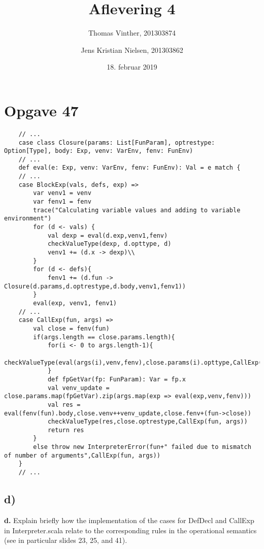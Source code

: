 \documentclass[a4paper, 10pt]{article}
\title{Aflevering 4}
\author{Thomas Vinther, 201303874 \and Jens Kristian Nielsen, 201303862}
\date{18. februar 2019}
\theoremstyle{remark}
\begin{document}
	\maketitle
	\section*{Opgave 47}
	\begin{lstlisting}
	// ...
	case class Closure(params: List[FunParam], optrestype: Option[Type], body: Exp, venv: VarEnv, fenv: FunEnv)
	// ...
	def eval(e: Exp, venv: VarEnv, fenv: FunEnv): Val = e match {
	// ...
	case BlockExp(vals, defs, exp) => 
		var venv1 = venv
		var fenv1 = fenv
		trace("Calculating variable values and adding to variable environment")
		for (d <- vals) {
			val dexp = eval(d.exp,venv1,fenv)
			checkValueType(dexp, d.opttype, d)
			venv1 += (d.x -> dexp)\\
		}
		for (d <- defs){
			fenv1 += (d.fun -> Closure(d.params,d.optrestype,d.body,venv1,fenv1))
		}
		eval(exp, venv1, fenv1)
	// ...
	case CallExp(fun, args) =>
		val close = fenv(fun)
		if(args.length == close.params.length){
			for(i <- 0 to args.length-1){
				checkValueType(eval(args(i),venv,fenv),close.params(i).opttype,CallExp(fun,args))
			}
			def fpGetVar(fp: FunParam): Var = fp.x
			val venv_update = close.params.map(fpGetVar).zip(args.map(exp => eval(exp,venv,fenv)))
			val res = eval(fenv(fun).body,close.venv++venv_update,close.fenv+(fun->close))
			checkValueType(res,close.optrestype,CallExp(fun, args))
			return res
		}
		else throw new InterpreterError(fun+" failed due to mismatch of number of arguments",CallExp(fun, args))
	}
	// ...
	\end{lstlisting}
	\subsection*{d)}
	\textbf{d.}
	Explain briefly how the implementation of the cases for DefDecl and CallExp in Interpreter.scala relate to the corresponding rules in the operational semantics (see in particular slides 23, 25, and 41).\\
	
\end{document}
